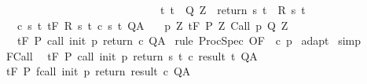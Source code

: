 \begin{isabellebody}
\ \ \ \ \ \ \ \ \ \ \ \ \ \ \ \ \ \ \ \ \ \ \ \ \ \ \ \ \ {\isacharparenleft}{\isasymforall}t{\isachardot}\ t\ {\isasymin}\ Q{\isacharprime}\ Z\ {\isasymlongrightarrow}\ return\ s\ t\ {\isasymin}\ R\ s\ t{\isacharparenright}{\isacharbraceright}{\isachardoublequoteclose}\isanewline
\ \ \ c{\isacharcolon}\ {\isachardoublequoteopen}{\isasymforall}s\ t{\isachardot}\ {\isasymGamma}{\isacharcomma}{\isasymTheta}{\isasymturnstile}\isactrlsub t\isactrlbsub {\isacharslash}F\isactrlesub \ {\isacharparenleft}R\ s\ t{\isacharparenright}\ {\isacharparenleft}c\ s\ t{\isacharparenright}\ Q{\isacharcomma}A{\isachardoublequoteclose}\isanewline
\ \ \ p{\isacharcolon}\ {\isachardoublequoteopen}{\isasymforall}Z{\isachardot}\ {\isasymGamma}{\isacharcomma}{\isasymTheta}{\isasymturnstile}\isactrlsub t\isactrlbsub {\isacharslash}F\isactrlesub \ {\isacharparenleft}P{\isacharprime}\ Z{\isacharparenright}\ Call\ p\ {\isacharparenleft}Q{\isacharprime}\ Z{\isacharparenright}{\isacharcomma}{\isacharbraceleft}{\isacharbraceright}{\isachardoublequoteclose}\ \isanewline
\ \ \ {\isachardoublequoteopen}{\isasymGamma}{\isacharcomma}{\isasymTheta}{\isasymturnstile}\isactrlsub t\isactrlbsub {\isacharslash}F\isactrlesub \ P\ {\isacharparenleft}call\ init\ p\ return\ c{\isacharparenright}\ Q{\isacharcomma}A{\isachardoublequoteclose}\isanewline
%
\isadelimproof
%
\endisadelimproof
%
\isatagproof
{}\isamarkupfalse%
\ {\isacharparenleft}rule\ ProcSpec\ {\isacharbrackleft}OF\ {\isacharunderscore}\ c\ p{\isacharbrackright}{\isacharparenright}\isanewline
{}\isamarkupfalse%
\ adapt\isanewline
{}\isamarkupfalse%
\ simp\isanewline
{}\isamarkupfalse%
%
\endisatagproof
{\isafoldproof}%
%
\isadelimproof
\isanewline
%
\endisadelimproof
\isanewline
{}\isamarkupfalse%
\ FCall{\isacharcolon}\ \ \isanewline
{\isachardoublequoteopen}{\isasymGamma}{\isacharcomma}{\isasymTheta}{\isasymturnstile}\isactrlsub t\isactrlbsub {\isacharslash}F\isactrlesub \ P\ {\isacharparenleft}call\ init\ p\ return\ {\isacharparenleft}{\isasymlambda}s\ t{\isachardot}\ c\ {\isacharparenleft}result\ t{\isacharparenright}{\isacharparenright}{\isacharparenright}\ Q{\isacharcomma}A\isanewline
{\isasymLongrightarrow}\ {\isasymGamma}{\isacharcomma}{\isasymTheta}{\isasymturnstile}\isactrlsub t\isactrlbsub {\isacharslash}F\isactrlesub \ P\ {\isacharparenleft}fcall\ init\ p\ return\ result\ c{\isacharparenright}\ Q{\isacharcomma}A{\isachardoublequoteclose}\isanewline
%
\isadelimproof
\ \ %
\endisadelimproof
%
\isatagproof

\end{isabellebody}
